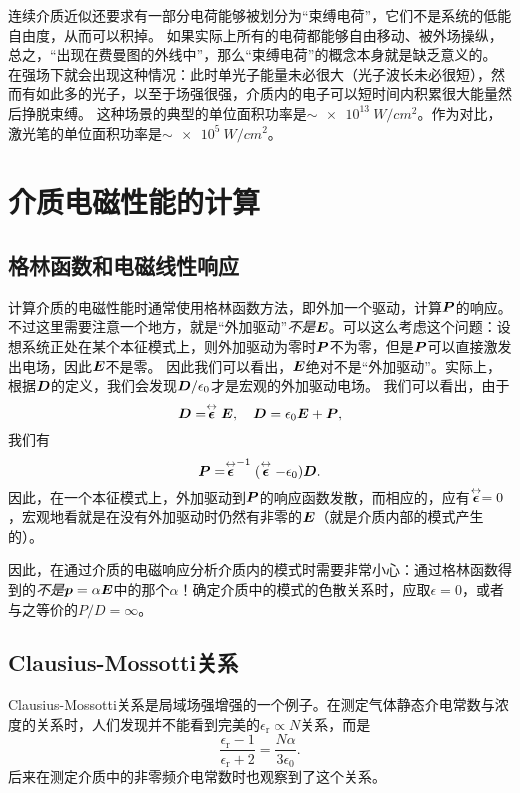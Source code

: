 连续介质近似还要求有一部分电荷能够被划分为“束缚电荷”，它们不是系统的低能自由度，从而可以积掉。
如果实际上所有的电荷都能够自由移动、被外场操纵，总之，“出现在费曼图的外线中”，那么“束缚电荷”的概念本身就是缺乏意义的。
在强场下就会出现这种情况：此时单光子能量未必很大（光子波长未必很短），然而有如此多的光子，以至于场强很强，介质内的电子可以短时间内积累很大能量然后挣脱束缚。
这种场景的典型的单位面积功率是$\sim\SI{e13}{W/cm^2}$。作为对比，激光笔的单位面积功率是$\sim \SI{e5}{W/cm^2}$。

\section{介质电磁性能的计算}

\subsection{格林函数和电磁线性响应}\label{sec:green-and-linear-response}

计算介质的电磁性能时通常使用格林函数方法，即外加一个驱动，计算$\vb*{P}$的响应。不过这里需要注意一个地方，就是“外加驱动”\emph{不是}$\vb*{E}$。可以这么考虑这个问题：设想系统正处在某个本征模式上，则外加驱动为零时$\vb*{P}$不为零，但是$\vb*{P}$可以直接激发出电场，因此$\vb*{E}$不是零。
因此我们可以看出，$\vb*{E}$绝对不是“外加驱动”。实际上，根据$\vb*{D}$的定义，我们会发现$\vb*{D} / \epsilon_0$才是宏观的外加驱动电场。
我们可以看出，由于
\[
    \vb*{D} = \stackrel{\leftrightarrow}{\vb*{\vb*{\epsilon}}} \vb*{E}, \quad \vb*{D} = \epsilon_0 \vb*{E} + \vb*{P},
\]
我们有
\begin{equation}
    \vb*{P} = \stackrel{\leftrightarrow}{\vb*{\vb*{\epsilon}}}^{-1} (\stackrel{\leftrightarrow}{\vb*{\vb*{\epsilon}}} - \epsilon_0) \vb*{D}.
\end{equation}
因此，在一个本征模式上，外加驱动到$\vb*{P}$的响应函数发散，而相应的，应有$\stackrel{\leftrightarrow}{\vb*{\vb*{\epsilon}}} = 0$，宏观地看就是在没有外加驱动时仍然有非零的$\vb*{E}$（就是介质内部的模式产生的）。

因此，在通过介质的电磁响应分析介质内的模式时需要非常小心：通过格林函数得到的\emph{不是}$\vb*{p} = \alpha \vb*{E}$中的那个$\alpha$！确定介质中的模式的色散关系时，应取$\epsilon = 0$，或者与之等价的$P / D = \infty$。

\subsection{Clausius-Mossotti关系}

Clausius-Mossotti关系是局域场强增强的一个例子。在测定气体静态介电常数与浓度的关系时，人们发现并不能看到完美的$\epsilon_\text{r} \propto N$关系，而是
\begin{equation}
    \frac{\epsilon_\text{r} - 1}{\epsilon_\text{r} + 2} = \frac{N \alpha}{3 \epsilon_0}.
    \label{eq:clausius-mossotti-relation}
\end{equation}
后来在测定介质中的非零频介电常数时也观察到了这个关系。

